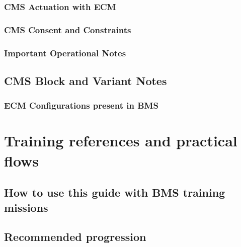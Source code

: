 \documentclass[11pt,a4paper]{article}
\begin{document}
\subsubsection{CMS Actuation with ECM}\label{sec:C5-S2-S2}


\subsubsection{CMS Consent and Constraints}\label{sec:C5-S2-S3}


\subsubsection{Important Operational Notes}\label{sec:C5-S2-S4}

\subsection{CMS Block and Variant Notes}\label{sec:C5-S3}



\subsubsection{ECM Configurations present in BMS}\label{sec:C5-S3-S1}

\section{Training references and practical flows}
\subsection{How to use this guide with BMS training missions}



\subsection{Recommended progression}
\end{document}
